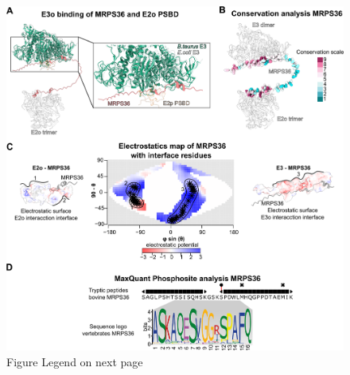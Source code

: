 \begin{subappendices}
\begin{figure}[hbt]
		\includegraphics[]{Chapter.5/Figures/SI_Figure3.png}
		\caption{Figure Legend on next page}
		\label{fig:ch5_app_fig3}
	\end{figure}
	\addtocounter{figure}{-1}
	\begin{figure}[ht!]

\end{figure}
\end{subappendices}
